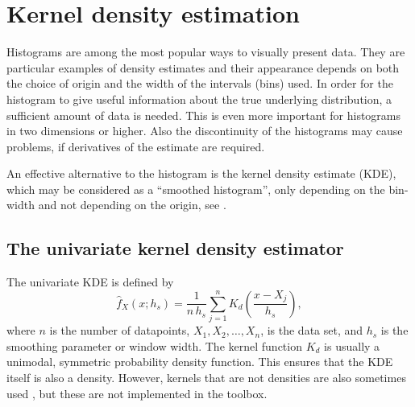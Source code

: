 %
\chapter{Kernel density estimation}
\label{cha:KDE}

Histograms are among the most popular ways to visually present data.
They are particular examples of density estimates and their appearance
depends on both the choice of origin and the width of the intervals
(bins) used. In order for the histogram to give useful information
about the true underlying distribution, a sufficient amount of data is
needed.  This is even more important for histograms in two dimensions or
higher. Also the discontinuity of the histograms may cause problems,
 \eg{,} if derivatives of the estimate are required.

An effective alternative to the histogram is the kernel density estimate (KDE),
which may be considered as a ``smoothed histogram'', only depending on
the bin-width and not depending on the origin, see
\cite{Silverman1986Density}.

\section{The univariate kernel density estimator}
The univariate KDE is defined by
\begin{equation}
  \label{eq:kdeformula}
  \hat{f}_{X}(x;h_{s}) = \frac{1}{n\,h_{s}}
                         \sum_{j=1}^{n} K_{d}\left( \frac{x-X_{j}}{h_{s}}\right),
\end{equation}
where $n$ is the number of datapoints, $X_{1},X_{2},\ldots,X_{n}$, is the
 data set, and $h_{s}$ is the smoothing parameter or window width. The
 kernel function $K_{d}$ is usually a unimodal, symmetric probability
 density function. This ensures that the KDE itself is also a density.
However, kernels that are not densities are also sometimes used
 \citep[see][]{WandAndJones1995Kernel}, but these are
not implemented in the \progname{} toolbox. 


